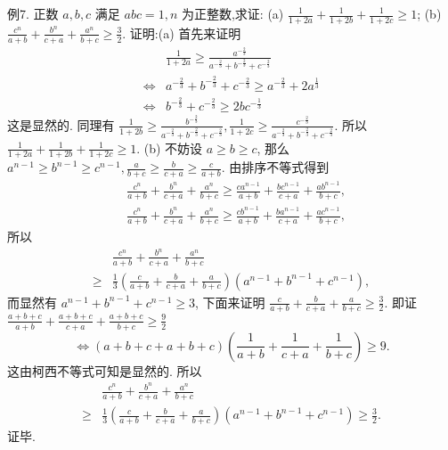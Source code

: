 例7. 正数 $a, b, c$ 满足 $a b c=1, n$ 为正整数,求证:
(a) $\frac{1}{1+2 a}+\frac{1}{1+2 b}+\frac{1}{1+2 c} \geqslant 1$;
(b) $\frac{c^n}{a+b}+\frac{b^n}{c+a}+\frac{a^n}{b+c} \geqslant \frac{3}{2}$.
证明:(a) 首先来证明
$$
\begin{aligned}
& \frac{1}{1+2 a} \geqslant \frac{a^{-\frac{2}{3}}}{a^{-\frac{2}{3}}+b^{-\frac{2}{3}}+c^{-\frac{2}{3}}} \\
\Leftrightarrow & a^{-\frac{2}{3}}+b^{-\frac{2}{3}}+c^{-\frac{2}{3}} \geqslant a^{-\frac{2}{3}}+2 a^{\frac{1}{3}} \\
\Leftrightarrow & b^{-\frac{2}{3}}+c^{-\frac{2}{3}} \geqslant 2 b c^{-\frac{1}{3}}
\end{aligned}
$$
这是显然的.
同理有 $\frac{1}{1+2 b} \geqslant \frac{b^{-\frac{2}{3}}}{a^{-\frac{2}{3}}+b^{-\frac{2}{3}}+c^{-\frac{2}{3}}}, \frac{1}{1+2 c} \geqslant \frac{c^{-\frac{2}{3}}}{a^{-\frac{2}{3}}+b^{-\frac{2}{3}}+c^{-\frac{2}{3}}}$.
所以 $\frac{1}{1+2 a}+\frac{1}{1+2 b}+\frac{1}{1+2 c} \geqslant 1$.
(b) 不妨设 $a \geqslant b \geqslant c$, 那么 $a^{n-1} \geqslant b^{n-1} \geqslant c^{n-1}, \frac{a}{b+c} \geqslant \frac{b}{c+a} \geqslant \frac{c}{a+b}$. 由排序不等式得到
$$
\begin{aligned}
& \frac{c^n}{a+b}+\frac{b^n}{c+a}+\frac{a^n}{b+c} \geqslant \frac{c a^{n-1}}{a+b}+\frac{b c^{n-1}}{c+a}+\frac{a b^{n-1}}{b+c}, \\
& \frac{c^n}{a+b}+\frac{b^n}{c+a}+\frac{a^n}{b+c} \geqslant \frac{c b^{n-1}}{a+b}+\frac{b a^{n-1}}{c+a}+\frac{a c^{n-1}}{b+c},
\end{aligned}
$$
所以
$$
\begin{aligned}
& \frac{c^n}{a+b}+\frac{b^n}{c+a}+\frac{a^n}{b+c} \\
\geqslant & \frac{1}{3}\left(\frac{c}{a+b}+\frac{b}{c+a}+\frac{a}{b+c}\right)\left(a^{n-1}+b^{n-1}+c^{n-1}\right),
\end{aligned}
$$
而显然有 $a^{n-1}+b^{n-1}+c^{n-1} \geqslant 3$, 下面来证明 $\frac{c}{a+b}+\frac{b}{c+a}+\frac{a}{b+c} \geqslant \frac{3}{2}$.
即证 $\frac{a+b+c}{a+b}+\frac{a+b+c}{c+a}+\frac{a+b+c}{b+c} \geqslant \frac{9}{2}$
$$
\Leftrightarrow(a+b+c+a+b+c)\left(\frac{1}{a+b}+\frac{1}{c+a}+\frac{1}{b+c}\right) \geqslant 9 .
$$
这由柯西不等式可知是显然的.
所以
$$
\begin{aligned}
& \frac{c^n}{a+b}+\frac{b^n}{c+a}+\frac{a^n}{b+c} \\
\geqslant & \frac{1}{3}\left(\frac{c}{a+b}+\frac{b}{c+a}+\frac{a}{b+c}\right)\left(a^{n-1}+b^{n-1}+c^{n-1}\right) \geqslant \frac{3}{2} .
\end{aligned}
$$
证毕.



